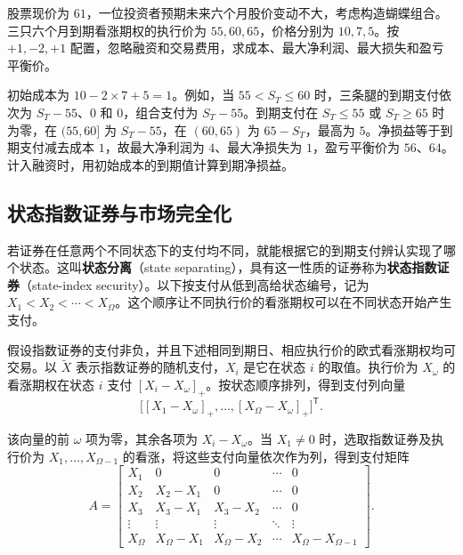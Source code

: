 \begin{tcolorbox}[example,title=课堂例题：蝴蝶组合的支付与利润]
\begin{question}
股票现价为 $61$，一位投资者预期未来六个月股价变动不大，考虑构造蝴蝶组合。三只六个月到期看涨期权的执行价为 $55,60,65$，价格分别为 $10,7,5$。按 $+1,-2,+1$ 配置，忽略融资和交易费用，求成本、最大净利润、最大损失和盈亏平衡价。
\end{question}
\begin{solution}
初始成本为 $10-2\times7+5=1$。例如，当 $55<S_T\le60$ 时，三条腿的到期支付依次为 $S_T-55$、$0$ 和 $0$，组合支付为 $S_T-55$。到期支付在 $S_T\le55$ 或 $S_T\ge65$ 时为零，在 $(55,60]$ 为 $S_T-55$，在 $(60,65)$ 为 $65-S_T$，最高为 $5$。净损益等于到期支付减去成本 $1$，故最大净利润为 $4$、最大净损失为 $1$，盈亏平衡价为 $56$、$64$。计入融资时，用初始成本的到期值计算到期净损益。
\end{solution}
\end{tcolorbox}

\subsection{状态指数证券与市场完全化}
\begin{tcolorbox}[knowledge,title=状态分离与状态指数证券]
若证券在任意两个不同状态下的支付均不同，就能根据它的到期支付辨认实现了哪个状态。这叫\textbf{状态分离}（state separating），具有这一性质的证券称为\textbf{状态指数证券}（state-index security）。以下按支付从低到高给状态编号，记为 $X_1<X_2<\cdots<X_\Omega$。这个顺序让不同执行价的看涨期权可以在不同状态开始产生支付。
\end{tcolorbox}
假设指数证券的支付非负，并且下述相同到期日、相应执行价的欧式看涨期权均可交易。以 $\tilde X$ 表示指数证券的随机支付，$X_i$ 是它在状态 $i$ 的取值。执行价为 $X_\omega$ 的看涨期权在状态 $i$ 支付 $[X_i-X_\omega]_+$。按状态顺序排列，得到支付列向量
\[
 \bigl[[X_1-X_\omega]_+,\ldots,[X_\Omega-X_\omega]_+\bigr]^{\mathsf T}.
\]

该向量的前 $\omega$ 项为零，其余各项为 $X_i-X_\omega$。当 $X_1\ne0$ 时，选取指数证券及执行价为 $X_1,\ldots,X_{\Omega-1}$ 的看涨，将这些支付向量依次作为列，得到支付矩阵
\[
 A=\begin{bmatrix}
 X_1&0&0&\cdots&0\\
 X_2&X_2-X_1&0&\cdots&0\\
 X_3&X_3-X_1&X_3-X_2&\cdots&0\\
 \vdots&\vdots&\vdots&\ddots&\vdots\\
 X_\Omega&X_\Omega-X_1&X_\Omega-X_2&\cdots&X_\Omega-X_{\Omega-1}
 \end{bmatrix}.
\]

